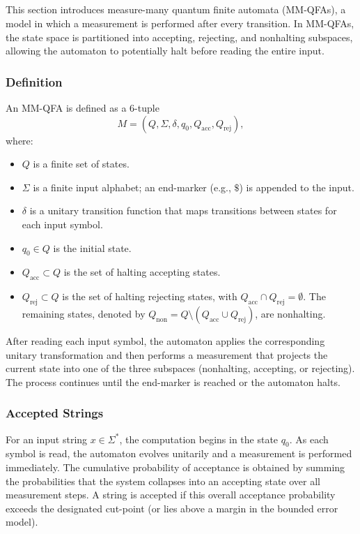 \subsection{}
\label{sec:mmqfa}
This section introduces measure-many quantum finite automata (MM-QFAs), a model in which a measurement is performed after every transition. In MM-QFAs, the state space is partitioned into accepting, rejecting, and nonhalting subspaces, allowing the automaton to potentially halt before reading the entire input.

\subsubsection{Definition}
An MM-QFA is defined as a 6-tuple
\[
M = (Q, \Sigma, \delta, q_0, Q_{\text{acc}}, Q_{\text{rej}}),
\]
where:
\begin{itemize}
  \item $Q$ is a finite set of states.
  \item $\Sigma$ is a finite input alphabet; an end-marker (e.g., $\$$) is appended to the input.
  \item $\delta$ is a unitary transition function that maps transitions between states for each input symbol.
  \item $q_0\in Q$ is the initial state.
  \item $Q_{\text{acc}}\subset Q$ is the set of halting accepting states.
  \item $Q_{\text{rej}}\subset Q$ is the set of halting rejecting states, with $Q_{\text{acc}}\cap Q_{\text{rej}}=\emptyset$. The remaining states, denoted by $Q_{\text{non}} = Q \setminus (Q_{\text{acc}}\cup Q_{\text{rej}})$, are nonhalting.
\end{itemize}
After reading each input symbol, the automaton applies the corresponding unitary transformation and then performs a measurement that projects the current state into one of the three subspaces (nonhalting, accepting, or rejecting). The process continues until the end-marker is reached or the automaton halts.

\subsubsection{Accepted Strings}
For an input string $x\in\Sigma^*$, the computation begins in the state $q_0$. As each symbol is read, the automaton evolves unitarily and a measurement is performed immediately. The cumulative probability of acceptance is obtained by summing the probabilities that the system collapses into an accepting state over all measurement steps. A string is accepted if this overall acceptance probability exceeds the designated cut-point (or lies above a margin in the bounded error model).


